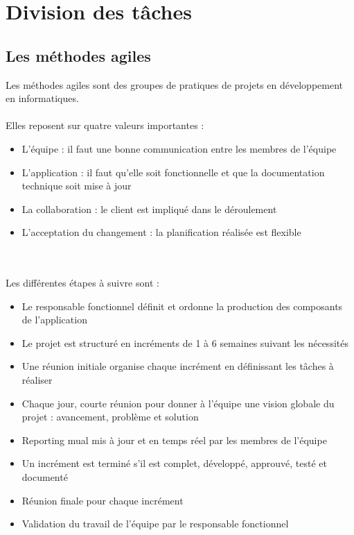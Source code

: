\section{Division des tâches}

\subsection{Les méthodes agiles}
Les méthodes agiles sont des groupes de pratiques de projets en développement en informatiques.\\
\\
Elles reposent sur quatre valeurs importantes : \\
\begin{itemize}
\item{L'équipe : il faut une bonne communication entre les membres de l'équipe}
\item{L'application : il faut qu'elle soit fonctionnelle et que la documentation technique soit mise à jour}
\item{La collaboration : le client est impliqué dans le déroulement}
\item{L'acceptation du changement : la planification réalisée est flexible}
\end{itemize} 
~\\
~\\
Les différentes étapes à suivre sont : \\
\begin{itemize}
\item{Le responsable fonctionnel définit et ordonne la production des composants de l'application}
\item{Le projet est structuré en incréments de 1 à 6 semaines suivant les nécessités}
\item{Une réunion initiale organise chaque incrément en définissant les tâches à réaliser}
\item{Chaque jour, courte réunion pour donner à l'équipe une vision globale du projet : avancement, problème et solution}
\item{Reporting mual mis à jour et en temps réel par les membres de l'équipe}
\item{Un incrément est terminé s'il est complet, développé, approuvé, testé et documenté}
\item{Réunion finale pour chaque incrément}
\item{Validation du travail de l'équipe par le responsable fonctionnel}
\end{itemize}
